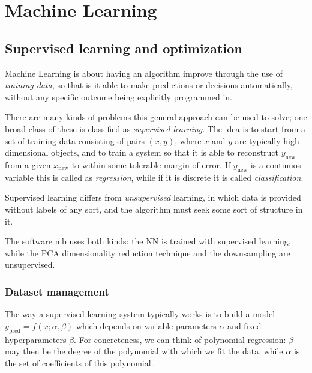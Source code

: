 \documentclass[main.tex]{subfiles}
\begin{document}
\chapter{Machine Learning}

\section{Supervised learning and optimization}

Machine Learning is about having an algorithm improve through the use of \emph{training data}, 
so that is it able to make predictions or decisions automatically, 
without any specific outcome being explicitly programmed in.

There are many kinds of problems this general approach can be used to solve; one broad class of these is classified as \emph{supervised learning}. 
The idea is to start from a set of training data consisting of pairs \((x, y)\), 
where \(x\) and \(y\) are typically high-dimensional objects, and to train a system so that 
it is able to reconstruct \(y _{\text{new}}\) from a given \(x _{\text{new}}\) to within some tolerable margin of error.
If \(y _{\text{new}}\) is a continuos variable this is called as \emph{regression}, while if it is discrete it is called \emph{classification}.

Supervised learning differs from \emph{unsupervised} learning, in which data is provided without labels of any sort, and the algorithm must seek some sort of structure in it.

The software \ac{mb} uses both kinds: the \ac{NN} is trained with supervised learning, while the \ac{PCA} dimensionality reduction technique and the downsampling are unsupervised. 

\subsection{Dataset management} \label{sec:dataset-management}

The way a supervised learning system typically works is to build a model \(y _{\text{pred}} = f(x; \alpha , \beta ) \) which depends on variable parameters \(\alpha \) and fixed hyperparameters \(\beta \).
For concreteness, we can think of polynomial regression: \(\beta \) may then be the degree of the polynomial with which we fit the data, while \(\alpha \) is the set of coefficients of this polynomial. 
\end{document}
